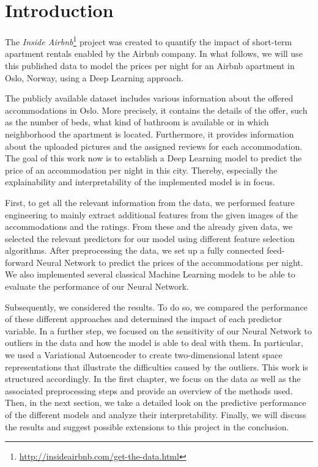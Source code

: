 \section{Introduction}


The \emph{Inside Airbnb}\footnote{\url{http://insideairbnb.com/get-the-data.html}} project \citep{cox2022} was created to quantify the impact of short-term apartment rentals enabled by the Airbnb company.
In what follows, we will use this published data to model the prices per night for an Airbnb apartment in Oslo, Norway, using a Deep Learning approach.

The publicly available dataset includes various information about the offered accommodations in Oslo.
More precisely, it contains the details of the offer, such as the number of beds, what kind of bathroom is available or in which neighborhood the apartment is located.
Furthermore, it provides information about the uploaded pictures and the assigned reviews for each accommodation.
The goal of this work now is to establish a Deep Learning model to predict the price of an accommodation per night in this city.
Thereby, especially the explainability and interpretability of the implemented model is in focus.

First, to get all the relevant information from the data, we performed feature engineering to mainly extract additional features from the given images of the accommodations and the ratings.
From these and the already given data, we selected the relevant predictors for our model using different feature selection algorithms.
After preprocessing the data, we set up a fully connected feed-forward Neural Network to predict the prices of the accommodations per night.
We also implemented several classical Machine Learning models to be able to evaluate the performance of our Neural Network.

Subsequently, we considered the results.
To do so, we compared the performance of these different approaches and determined the impact of each predictor variable.
In a further step, we focused on the sensitivity of our Neural Network to outliers in the data and how the model is able to deal with them.
In particular, we used a Variational Autoencoder to create two-dimensional latent space representations that illustrate the difficulties caused by the outliers.
This work is structured accordingly.
In the first chapter, we focus on the data as well as the associated preprocessing steps and provide an overview of the methods used.
Then, in the next section, we take a detailed look on the predictive performance of the different models and analyze their interpretability.
Finally, we will discuss the results and suggest possible extensions to this project in the conclusion.

